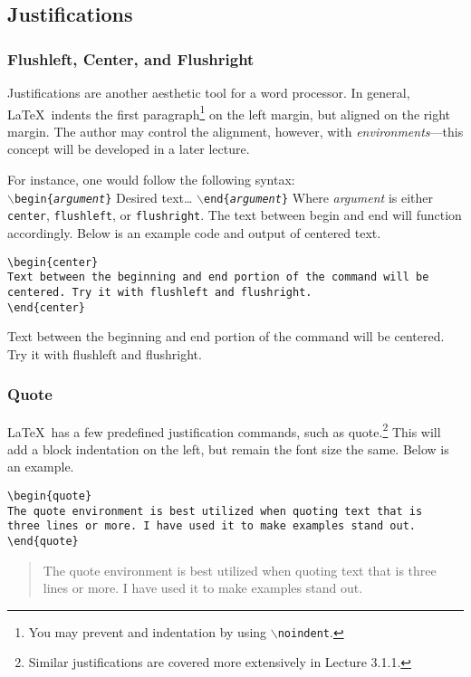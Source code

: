 \documentclass{article}
\begin{document}
\subsection{Justifications}

\subsubsection{Flushleft, Center, and Flushright}

Justifications are another aesthetic tool for a word processor. In general, \LaTeX\ indents the first paragraph\footnote{You may prevent and indentation by using \texttt{$\backslash$noindent}.} on the left margin, but aligned on the right margin. The author may control the alignment, however, with \emph{environments}---this concept will be developed in a later lecture.

For instance, one would follow the following syntax:
\\
\noindent
\texttt{$\backslash$begin\{\textit{argument}\}}
Desired text\ldots
\texttt{$\backslash$end\{\textit{argument}\}}
Where \textit{argument} is either \texttt{center}, \texttt{flushleft}, or \texttt{flushright}. The text between begin and end will function accordingly. Below is an example code and output of centered text.
\begin{verbatim}
\begin{center}
Text between the beginning and end portion of the command will be 
centered. Try it with flushleft and flushright.
\end{center}
\end{verbatim}
\begin{center}
Text between the beginning and end portion of the command will be 
centered. Try it with flushleft and flushright.
\end{center}

\subsubsection{Quote}

\LaTeX\ has a few predefined justification commands, such as quote.\footnote{Similar justifications are covered more extensively in Lecture 3.1.1.} This will add a block indentation on the left, but remain the font size the same. Below is an example.
\begin{verbatim}
\begin{quote}
The quote environment is best utilized when quoting text that is 
three lines or more. I have used it to make examples stand out.
\end{quote}
\end{verbatim}
\begin{quote}
The quote environment is best utilized when quoting text that is 
three lines or more. I have used it to make examples stand out.
\end{quote}
\end{document}
